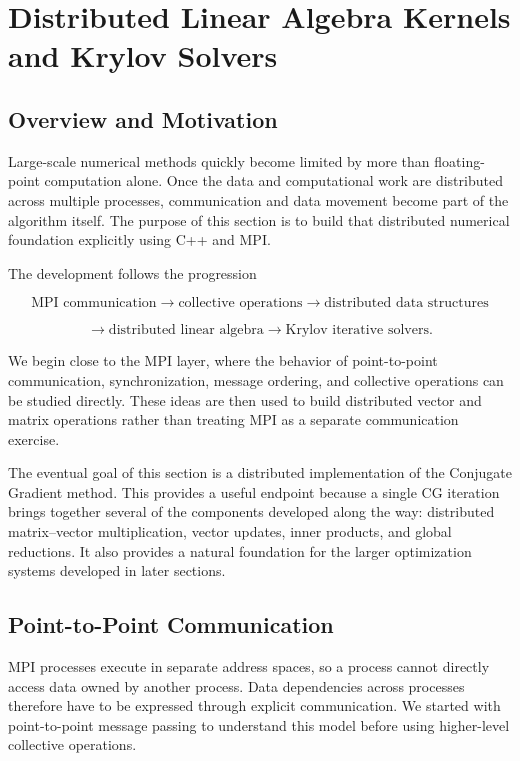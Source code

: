 \section{Distributed Linear Algebra Kernels and Krylov Solvers}

\subsection{Overview and Motivation}

Large-scale numerical methods quickly become limited by more than
floating-point computation alone. Once the data and computational work
are distributed across multiple processes, communication and data
movement become part of the algorithm itself. The purpose of this
section is to build that distributed numerical foundation explicitly
using C++ and MPI.

The development follows the progression

$$
\text{MPI communication}
\rightarrow
\text{collective operations}
\rightarrow
\text{distributed data structures}
$$

$$
\rightarrow
\text{distributed linear algebra}
\rightarrow
\text{Krylov iterative solvers}.
$$

We begin close to the MPI layer, where the behavior of point-to-point
communication, synchronization, message ordering, and collective
operations can be studied directly. These ideas are then used to build
distributed vector and matrix operations rather than treating MPI as a
separate communication exercise.

The eventual goal of this section is a distributed implementation of
the Conjugate Gradient method. This provides a useful endpoint because
a single CG iteration brings together several of the components
developed along the way: distributed matrix--vector multiplication,
vector updates, inner products, and global reductions. It also provides
a natural foundation for the larger optimization systems developed in
later sections.


\subsection{Point-to-Point Communication}

MPI processes execute in separate address spaces, so a process cannot
directly access data owned by another process. Data dependencies across
processes therefore have to be expressed through explicit communication.
We started with point-to-point message passing to understand this model
before using higher-level collective operations.

